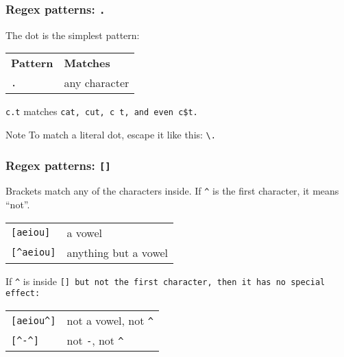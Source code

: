 \begin{frame}[fragile]
\frametitle{Regex patterns: \tt{.}}
The dot is the simplest pattern:
\begin{table}
    \centering
    \begin{tabular}{ll}
        \textbf{Pattern}    & \textbf{Matches} \\
        \verb|.|            & any character \\
    \end{tabular}
\end{table}

\begin{example}
    \verb|c.t| matches \tt{cat}, \tt{cut}, \tt{c t}, and even \tt{c\$t}.
\end{example}

\begin{block}{Note}
    To match a literal dot, escape it like this: \verb|\.|
\end{block}
\end{frame}

\begin{frame}[fragile]
\frametitle{Regex patterns: \tt{[]}}
Brackets match any of the characters inside.
If \verb|^| is the first character, it means ``not''.
\begin{table}
    \centering
    \begin{tabular}{ll}
        \verb|[aeiou]|      & a vowel \\
        \verb|[^aeiou]|     & anything but a vowel \\
    \end{tabular}
\end{table}
If \verb|^| is inside \tt{[]} but not the first character, then it has no
special effect:
\begin{table}
    \centering
    \begin{tabular}{ll}
        \verb|[aeiou^]|     & not a vowel, not \verb|^| \\
        \verb|[^-^]|        & not \verb|-|, not \verb|^| \\
    \end{tabular}
\end{table}
\end{frame}

